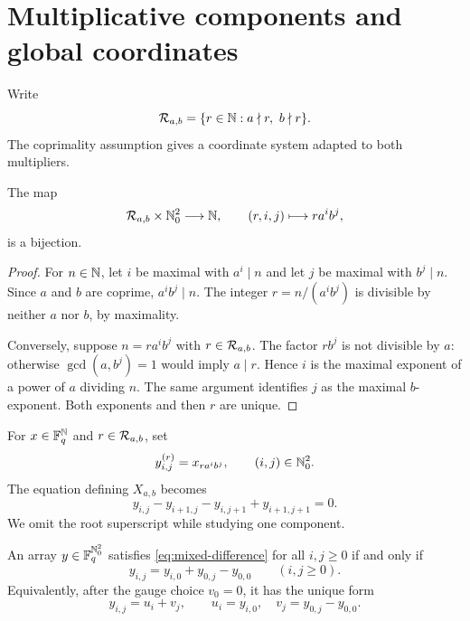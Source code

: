 \section{Multiplicative components and global coordinates}\label{sec:coordinates}

Write
\[
 \cR_{a,b}=\{r\in\N:a\nmid r,\ b\nmid r\}.
\]
The coprimality assumption gives a coordinate system adapted to both
multipliers.

\begin{lemma}\label{lem:root-decomposition}
The map
\[
 \mathcal R_{a,b}\times\mathbb N_0^2\longrightarrow\mathbb N,
 \qquad (r,i,j)\longmapsto r a^i b^j,
\]
is a bijection.
\end{lemma}

\begin{proof}
For $n\in\mathbb N$, let $i$ be maximal with $a^i\mid n$ and let $j$ be maximal
with $b^j\mid n$.  Since $a$ and $b$ are coprime, $a^i b^j\mid n$.  The
integer $r=n/(a^i b^j)$ is divisible by neither $a$ nor $b$, by maximality.

Conversely, suppose $n=r a^i b^j$ with $r\in\mathcal R_{a,b}$.  The factor
$r b^j$ is not divisible by $a$: otherwise $\gcd(a,b^j)=1$ would imply
$a\mid r$.  Hence $i$ is the maximal exponent of a power of $a$ dividing
$n$.  The same argument identifies $j$ as the maximal $b$-exponent.  Both
exponents and then $r$ are unique.
\end{proof}

For $x\in\mathbb F_q^{\mathbb N}$ and $r\in\mathcal R_{a,b}$, set
\[
 y^{(r)}_{i,j}=x_{r a^i b^j},
 \qquad (i,j)\in\mathbb N_0^2.
\]
The equation defining $X_{a,b}$ becomes
\begin{equation}\label{eq:mixed-difference}
 y_{i,j}-y_{i+1,j}-y_{i,j+1}+y_{i+1,j+1}=0.
\end{equation}
We omit the root superscript while studying one component.

\begin{lemma}\label{lem:integrate}
An array $y\in\mathbb F_q^{\mathbb N_0^2}$ satisfies
\eqref{eq:mixed-difference} for all $i,j\geq0$ if and only if
\begin{equation}\label{eq:integrated}
 y_{i,j}=y_{i,0}+y_{0,j}-y_{0,0}
 \qquad(i,j\geq0).
\end{equation}
Equivalently, after the gauge choice $v_0=0$, it has the unique form
\begin{equation}\label{eq:u-plus-v}
 y_{i,j}=u_i+v_j,
 \qquad
 u_i=y_{i,0},\quad v_j=y_{0,j}-y_{0,0}.
\end{equation}
\end{lemma}

